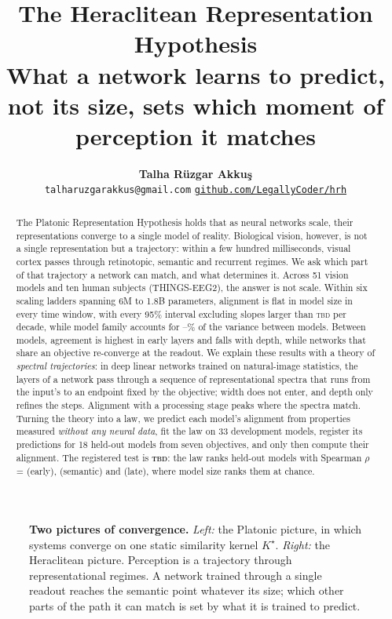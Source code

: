 \documentclass[10pt]{article}
\title{%
  \vspace{-1.2em}
  {\LARGE\bfseries The Heraclitean Representation Hypothesis}\\[6pt]
  {\large What a network learns to predict, not its size, sets which moment of perception it matches}}
\author{%
  \textbf{Talha R\"uzgar Akku\c{s}}\\[2pt]
  {\small\texttt{talharuzgarakkus@gmail.com}}\quad
  {\small\href{https://github.com/LegallyCoder/hrh}{\texttt{github.com/LegallyCoder/hrh}}}}
\date{}
\theoremstyle{plain}
\theoremstyle{definition}
\theoremstyle{remark}
\newcommand{\tbd}{\textcolor{hrhmuted}{\textsc{tbd}}}
\newcommand{\vNdev}{33}\newcommand{\vNheld}{18}\newcommand{\vNall}{51}
\newcommand{\vLawVerdict}{\tbd}\newcommand{\vHash}{\tbd}\newcommand{\vSlopeBound}{\tbd}
\begin{document}
\maketitle
\thispagestyle{empty}

\begin{abstract}
\noindent
The Platonic Representation Hypothesis holds that as neural networks scale, their
representations converge to a single model of reality. Biological vision, however, is not a
single representation but a trajectory: within a few hundred milliseconds, visual cortex passes
through retinotopic, semantic and recurrent regimes. We ask which part of that trajectory a
network can match, and what determines it. Across \vNall{} vision models and ten human
subjects (THINGS-EEG2), the answer is not scale. Within six scaling ladders spanning 6M to
1.8B parameters, alignment is flat in model size in every time window, with every 95\% interval
excluding slopes larger than \vSlopeBound{} per decade, while model family accounts for
\vVarFamMin--\vVarFamMax\% of the variance between models. Between models, agreement is highest in
early layers and falls with depth, while networks that share an objective re-converge at the
readout. We explain these results with a theory of \emph{spectral trajectories}: in deep linear networks trained on natural-image statistics, the
layers of a network pass through a sequence of representational spectra that runs from the
input's to an endpoint fixed by the objective; width does not enter, and depth only refines the
steps. Alignment with a processing stage peaks where the spectra match. Turning the theory into
a law, we predict each model's alignment from properties measured \emph{without any neural
data}, fit the law on \vNdev{} development models, register its predictions for \vNheld{}
held-out models from seven objectives, and only then compute their alignment. The registered
test is \textbf{\vLawVerdict}: the law ranks held-out models with Spearman
$\rho$ = \vRhoEarly{} (early), \vRhoMid{} (semantic) and \vRhoLate{} (late), where model size
ranks them at chance.
\end{abstract}

\begin{figure}[t]
  \centering
  
  \caption{\textbf{Two pictures of convergence.} \emph{Left:} the Platonic picture, in which
    systems converge on one static similarity kernel $K^\star$. \emph{Right:} the Heraclitean
    picture. Perception is a trajectory through representational regimes. A network trained
    through a single readout reaches the semantic point whatever its size; which other parts of
    the path it can match is set by what it is trained to predict.}
  \label{fig:teaser}
\end{figure}
\end{document}
